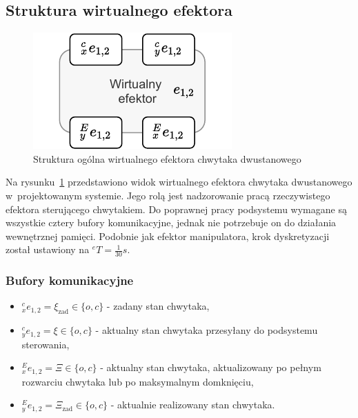 \subsection{Struktura wirtualnego efektora}
\label{subsec:ve-gripper-struktura}

\begin{figure}[ht]
    \centering
    \includegraphics[width=0.75\columnwidth]{figures/ISR-ve-gripper-model.pdf}
    \caption{Struktura ogólna wirtualnego efektora chwytaka dwustanowego}
    \label{fig:model-ve-gripper}
\end{figure}

Na rysunku~\ref{fig:model-ve-gripper} przedstawiono widok wirtualnego efektora chwytaka dwustanowego w~projektowanym systemie. Jego rolą jest nadzorowanie pracą rzeczywistego efektora sterującego chwytakiem. Do poprawnej pracy podsystemu wymagane są wszystkie cztery bufory komunikacyjne, jednak nie potrzebuje on do działania wewnętrznej pamięci. Podobnie jak efektor manipulatora, krok dyskretyzacji został ustawiony na ${}^{e}T = \frac{1}{30}s$.

\subsubsection{Bufory komunikacyjne}
\begin{itemize}
    \item ${}^{c}_{x}e_{1,2} = \xi_{\mathrm{zad}} \in \{o, c\}$ - zadany stan chwytaka,
    \item ${}^{c}_{y}e_{1,2} = \xi \in \{o, c\}$ - aktualny stan chwytaka przesyłany do podsystemu sterowania,
    \item ${}^{E}_{x}e_{1,2} = \Xi \in \{o, c\}$ - aktualny stan chwytaka, aktualizowany po pełnym rozwarciu chwytaka lub po maksymalnym domknięciu,
    \item ${}^{E}_{y}e_{1,2} = \Xi_{\mathrm{zad}} \in \{o, c\}$ - aktualnie realizowany stan chwytaka.
\end{itemize}

